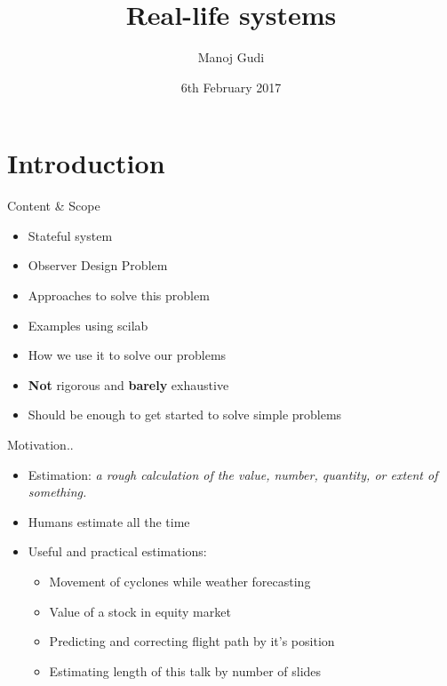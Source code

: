\documentclass{beamer}
\title[Real-life systems]{Real-life systems}
\author{Manoj Gudi}
\institute{Ex-R.A. FOSSEE | CTO | Focus Analytics}
\date{6th February 2017}
\begin{document}
\begin{frame}
  \titlepage
\end{frame}


\section{Introduction}
\begin{frame}{Content \& Scope}
\begin{itemize}
  \item Stateful system
  \item Observer Design Problem
  \item Approaches to solve this problem
  \item Examples using scilab
  \item How we use it to solve our problems
  \item \textbf{Not} rigorous and \textbf{barely} exhaustive
  \item Should be enough to get started to solve simple problems
\end{itemize}
\vskip 1cm
\end{frame}
\begin{frame}{Motivation..}

\begin{itemize}
  \item Estimation: \textit{a rough calculation of the value, number, quantity, or extent of something.}
  \item Humans estimate all the time
  \item Useful and practical estimations:
  \begin{itemize}
    \item Movement of cyclones while weather forecasting
    \item Value of a stock in equity market
    \item Predicting and correcting flight path by it's position
    \item Estimating length of this talk by number of slides
  \end{itemize}
\end{itemize}
\vskip 1cm
\end{frame}
\end{document}

